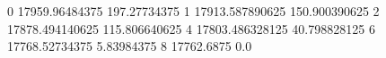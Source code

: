 0 17959.96484375 197.27734375
1 17913.587890625 150.900390625
2 17878.494140625 115.806640625
4 17803.486328125 40.798828125
6 17768.52734375 5.83984375
8 17762.6875 0.0
